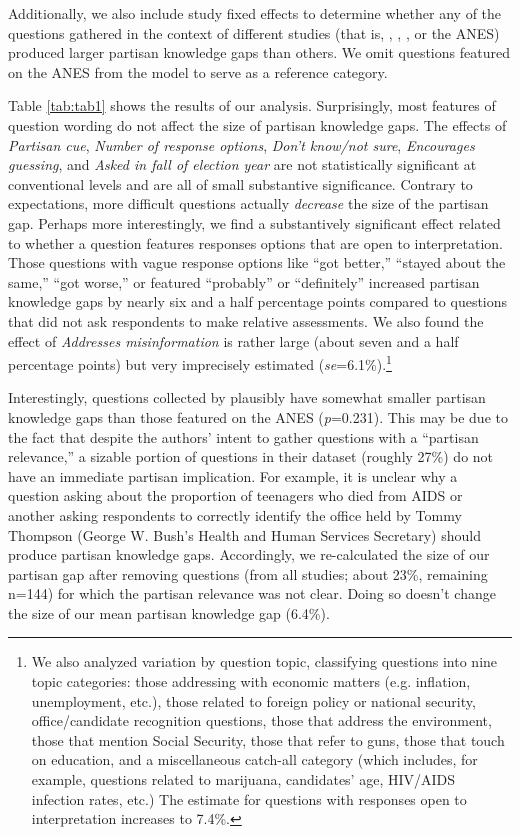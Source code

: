\documentclass[12pt, letterpaper]{article}
\begin{document}
Additionally, we also include study fixed effects to determine whether any of the questions gathered in the context of different studies (that is, \citet{bullocketal_2015}, \citet{prior2015you}, \citet{jerit2012partisan}, or the ANES) produced larger partisan knowledge gaps than others. We omit questions featured on the ANES from the model to serve as a reference category. 



Table \ref{tab:tab1} shows the results of our analysis. Surprisingly, most features of question wording do not affect the size of partisan knowledge gaps. The effects of \textit{Partisan cue}, \textit{Number of response options}, \textit{Don't know/not sure}, \textit{Encourages guessing}, and \textit{Asked in fall of election year} are not statistically significant at conventional levels and are all of small substantive significance. Contrary to expectations, more difficult questions actually \textit{decrease} the size of the partisan gap. Perhaps more interestingly, we find a substantively significant effect related to whether a question features responses options that are open to interpretation. Those questions with vague response options like ``got better,'' ``stayed about the same,'' ``got worse,'' or featured ``probably'' or ``definitely'' increased partisan knowledge gaps by nearly six and a half percentage points compared to questions that did not ask respondents to make relative assessments. We also found the effect of \textit{Addresses misinformation} is rather large (about seven and a half percentage points) but very imprecisely estimated (\textit{se}=6.1\%).\footnote{We also analyzed variation by question topic, classifying questions into nine topic categories: those addressing with economic matters (e.g. inflation, unemployment, etc.), those related to foreign policy or national security, office/candidate recognition questions, those that address the environment, those that mention Social Security, those that refer to guns, those that touch on education, and a miscellaneous catch-all category (which includes, for example, questions related to marijuana, candidates' age, HIV/AIDS infection rates, etc.) The estimate for questions with responses open to interpretation increases to 7.4\%.} 

Interestingly, questions collected by \citet{jerit2012partisan} plausibly have somewhat smaller partisan knowledge gaps than those featured on the ANES (\textit{p}=0.231). This may be due to the fact that despite the authors' intent to gather questions with a ``partisan relevance,'' a sizable portion of questions in their dataset (roughly 27\%) do not have an immediate partisan implication. For example, it is unclear why a question asking about the proportion of teenagers who died from AIDS or another asking respondents to correctly identify the office held by Tommy Thompson (George W. Bush's Health and Human Services Secretary) should produce partisan knowledge gaps. Accordingly, we re-calculated the size of our partisan gap after removing questions (from all studies; about 23\%, remaining {n}=144) for which the partisan relevance was not clear. Doing so doesn't change the size of our mean partisan knowledge gap (6.4\%). 
\end{document}
